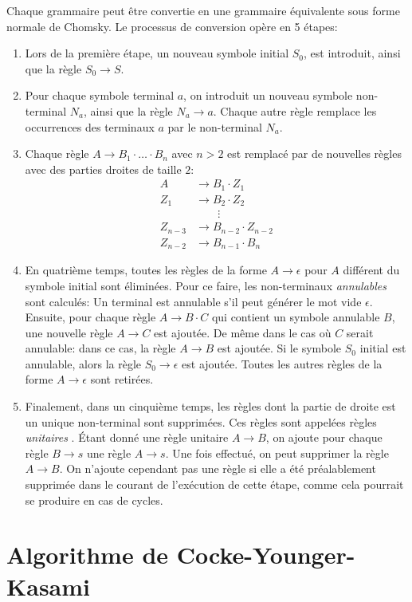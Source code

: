 Chaque grammaire peut être convertie en une grammaire équivalente sous forme normale de Chomsky.
Le processus de conversion opère en 5 étapes:
\begin{enumerate}
\item Lors de la première étape, un nouveau symbole initial $S_0$, est introduit, ainsi que la règle $S_0 \to S$.
\item Pour chaque symbole terminal $a$, on introduit un nouveau symbole non-terminal $N_a$, ainsi que la règle $N_a \to a$.
Chaque autre règle remplace les occurrences des terminaux $a$ par le non-terminal $N_a$.
\item Chaque règle $A \to B_1 \cdot \ldots \cdot B_n$ avec $n > 2$ est remplacé par de nouvelles règles avec des parties droites de taille $2$:
\begin{align*}
A &\to B_1 \cdot Z_1\\
Z_1 &\to B_2 \cdot Z_2\\
&\hspace{2em} \vdots\\
Z_{n - 3} &\to B_{n - 2} \cdot Z_{n - 2}\\
Z_{n - 2} &\to B_{n - 1} \cdot B_n
\end{align*}
\item En quatrième temps, toutes les règles de la forme $A \to \epsilon$ pour $A$ différent du symbole initial sont éliminées.
Pour ce faire, les non-terminaux \og \textit{annulables} \fg{} sont calculés: Un terminal est annulable s'il peut générer le mot vide $\epsilon$.
Ensuite, pour chaque règle $A \to B \cdot C$ qui contient un symbole annulable $B$, une nouvelle règle $A \to C$ est ajoutée.
De même dans le cas où $C$ serait annulable: dans ce cas, la règle $A \to B$ est ajoutée.
Si le symbole $S_0$ initial est annulable, alors la règle $S_0 \to \epsilon$ est ajoutée.
Toutes les autres règles de la forme $A \to \epsilon$ sont retirées.
\item
Finalement, dans un cinquième temps, les règles dont la partie de droite est un unique non-terminal sont supprimées.
Ces règles sont appelées règles \og \textit{unitaires} \fg{}.
Étant donné une règle unitaire $A \to B$, on ajoute pour chaque règle $B \to s$ une règle $A \to s$. Une fois effectué, on peut supprimer la règle $A \to B$. On n'ajoute cependant pas une règle si elle a été préalablement supprimée dans le courant de l'exécution de cette étape, comme cela pourrait se produire en cas de cycles. 	 
\end{enumerate}

\section{Algorithme de Cocke-Younger-Kasami}

